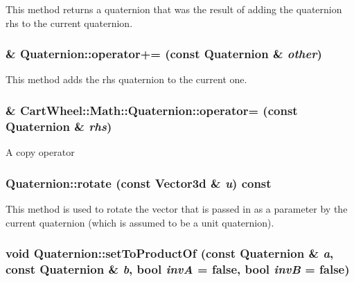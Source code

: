 \label{classCartWheel_1_1Math_1_1Quaternion_a79270e624e3e99620857535b3c8565a1}
This method returns a quaternion that was the result of adding the quaternion rhs to the current quaternion. \hypertarget{classCartWheel_1_1Math_1_1Quaternion_a2ae0c9a6064b0a9fa9f0687dd39e318d}{
\subsubsection[{operator+=}]{ \& Quaternion::operator+= (const {\bf Quaternion} \& {\em other})}}
\label{classCartWheel_1_1Math_1_1Quaternion_a2ae0c9a6064b0a9fa9f0687dd39e318d}
This method adds the rhs quaternion to the current one. \hypertarget{classCartWheel_1_1Math_1_1Quaternion_a60801cdb44f546258ae4755d689532a2}{
\subsubsection[{operator=}]{\& CartWheel::Math::Quaternion::operator= (const {\bf Quaternion} \& {\em rhs})}}
\label{classCartWheel_1_1Math_1_1Quaternion_a60801cdb44f546258ae4755d689532a2}
A copy operator \hypertarget{classCartWheel_1_1Math_1_1Quaternion_a3b9e77a2f65cea67f5687b0c6dcf11c3}{
\subsubsection[{rotate}]{ Quaternion::rotate (const {\bf Vector3d} \& {\em u}) const}}
\label{classCartWheel_1_1Math_1_1Quaternion_a3b9e77a2f65cea67f5687b0c6dcf11c3}
This method is used to rotate the vector that is passed in as a parameter by the current quaternion (which is assumed to be a unit quaternion). \hypertarget{classCartWheel_1_1Math_1_1Quaternion_a16760d63cc452ac36d9bdb200a1d8374}{
\subsubsection[{setToProductOf}]{\setlength{\rightskip}{0pt plus 5cm}void Quaternion::setToProductOf (const {\bf Quaternion} \& {\em a}, \/  const {\bf Quaternion} \& {\em b}, \/  bool {\em invA} = {\ttfamily false}, \/  bool {\em invB} = {\ttfamily false})}}
